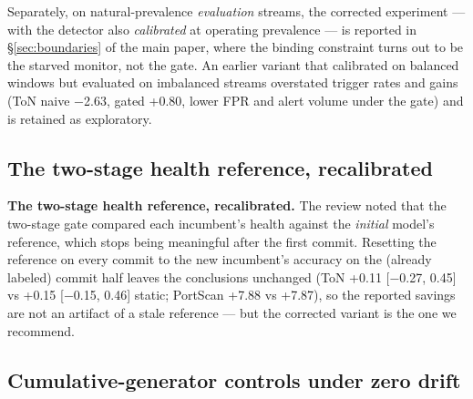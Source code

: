 \documentclass[a4paper,11pt]{article}
\makeatletter
\let\supp@subsection\subsection
\renewcommand{\subsection}{\FloatBarrier\supp@subsection}
\makeatother
\begin{document}
Separately, on natural-prevalence \emph{evaluation} streams, the corrected experiment --- with the detector also \emph{calibrated} at operating prevalence --- is reported in \S\ref{sec:boundaries} of the main paper, where the binding constraint turns out to be the starved monitor, not the gate. An earlier variant that calibrated on balanced windows but evaluated on imbalanced streams overstated trigger rates and gains (ToN naive $-$2.63, gated +0.80, lower FPR and alert volume under the gate) and is retained as exploratory.

\subsection{The two-stage health reference, recalibrated}

\textbf{The two-stage health reference, recalibrated.} The review noted that the two-stage gate compared each incumbent's health against the \emph{initial} model's reference, which stops being meaningful after the first commit. Resetting the reference on every commit to the new incumbent's accuracy on the (already labeled) commit half leaves the conclusions unchanged (ToN +0.11 [$-$0.27, 0.45] vs +0.15 [$-$0.15, 0.46] static; PortScan +7.88 vs +7.87), so the reported savings are not an artifact of a stale reference --- but the corrected variant is the one we recommend.

\subsection{Cumulative-generator controls under zero drift}
\end{document}
